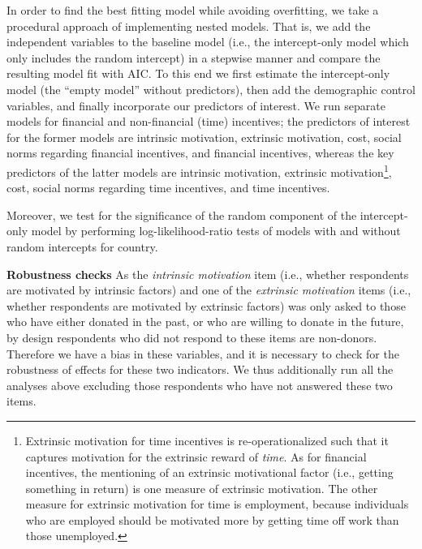 \documentclass[AER]{AEA}
\begin{document}
In order to find the best fitting model while avoiding overfitting, we take a procedural approach of implementing nested models. That is, we add the independent variables to the baseline model (i.e., the intercept-only model which only includes the random intercept) in a stepwise manner and compare the resulting model fit with AIC. To this end we first estimate the intercept-only model (the “empty model” without predictors), then add the demographic control variables, and finally incorporate our predictors of interest. We run separate models for financial and non-financial (time) incentives; the predictors of interest for the former models are intrinsic motivation, extrinsic motivation, cost, social norms regarding financial incentives, and financial incentives, whereas the key predictors of the latter models are intrinsic motivation, extrinsic motivation\footnote{Extrinsic motivation for time incentives is re-operationalized such that it captures motivation for the extrinsic reward of \textit{time}. As for financial incentives, the mentioning of an extrinsic motivational factor (i.e., getting something in return) is one measure of extrinsic motivation. The other measure for extrinsic motivation for time is employment, because individuals who are employed should be motivated more by getting time off work than those unemployed.}, cost, social norms regarding time incentives, and time incentives. 

Moreover, we test for the significance of the random component of the intercept-only model by performing log-likelihood-ratio tests of models with and without random intercepts for country.

\textbf{Robustness checks} As the \textit{intrinsic motivation} item (i.e., whether respondents are motivated by intrinsic factors) and one of the \textit{extrinsic motivation} items (i.e., whether respondents are motivated by extrinsic factors) was only asked to those who have either donated in the past, or who are willing to donate in the future, by design respondents who did not respond to these items are non-donors. Therefore we have a bias in these variables, and it is necessary to check for the robustness of effects for these two indicators. We thus additionally run all the analyses above excluding those respondents who have not answered these two items. 
\end{document}
